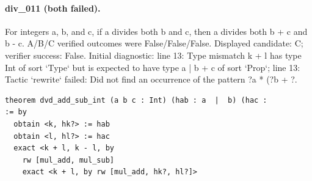 \paragraph{div\_011 (both failed).}
For integers a, b, and c, if a divides both b and c, then a divides both b + c and b - c. A/B/C verified outcomes were False/False/False.
Displayed candidate: C; verifier success: False.
Initial diagnostic: line 13: Type mismatch
  k + l
has type
  Int
of sort `Type` but is expected to have type
  a  |  b + c
of sort `Prop`; line 13: Tactic `rewrite` failed: Did not find an occurrence of the pattern
  ?a * (?b + ?.
\begin{verbatim}
theorem dvd_add_sub_int (a b c : Int) (hab : a  |  b) (hac :
:= by
  obtain <k, hk?> := hab
  obtain <l, hl?> := hac
  exact <k + l, k - l, by
    rw [mul_add, mul_sub]
    exact <k + l, by rw [mul_add, hk?, hl?]>
\end{verbatim}
